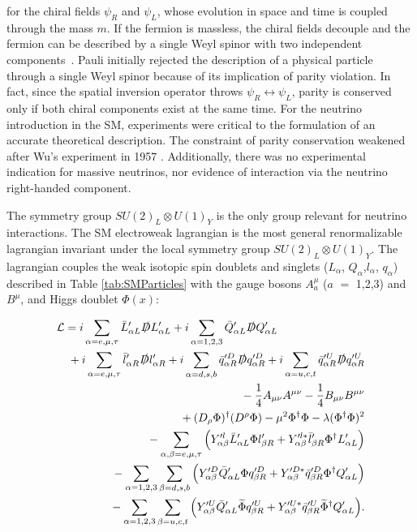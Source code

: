 for the chiral fields $\psi_R$ and $\psi_L$, whose evolution in space and time is coupled through the mass $m$.
If the fermion is massless, the chiral fields decouple and the fermion can be described by a single Weyl spinor with two independent components~\cite{Weyl:10.2307}. Pauli initially rejected the description of a physical particle through a single Weyl spinor because of its implication of parity violation. In fact, since the spatial inversion operator throws $\psi_R \leftrightarrow \psi_L$, parity is conserved only if both chiral components exist at the same time.  For the neutrino introduction in the SM, experiments were critical to the formulation of an accurate theoretical description.  The constraint of parity conservation weakened after Wu's experiment in 1957 \cite{PhysRev.105.1413}. Additionally,  there was no experimental indication for massive neutrinos, nor evidence of interaction via the neutrino right-handed component.%

The symmetry group $SU(2)_L \otimes U(1)_Y$ is the only group relevant for neutrino interactions. The SM electroweak lagrangian is the most general renormalizable lagrangian invariant under the local symmetry group $SU(2)_L \otimes U(1)_Y$. The lagrangian couples the weak isotopic spin doublets and singlets ($L_{\alpha}$, $Q_{\alpha}$,$l_{\alpha}$, $q_{\alpha}$) described in Table \ref{tab:SMParticles}  with the gauge bosons  $A^{\mu}_{a}$ ($a$ $=$ 1,2,3) and $B^{\mu}$, and Higgs doublet $\Phi(x)$:

\begin{eqnarray}
\lefteqn{\mathcal{L} = i\sum_{\alpha=e,\mu,\tau} \bar{L}'_{\alpha L}  \slashed D L'_{\alpha L} + 
 i\sum_{\alpha=1,2,3} \bar{Q}'_{\alpha L}  \slashed D Q'_{\alpha L} {}}
 \nonumber\\
 & & {} + i\sum_{\alpha=e,\mu,\tau} \bar{l}'_{\alpha R}  \slashed D l'_{\alpha R} + i\sum_{\alpha=d,s,b} \bar{q}'^D_{\alpha R}  \slashed D q'^D_{\alpha R} + i\sum_{\alpha=u,c,t} \bar{q}'^U_{\alpha R}  \slashed D q'^U_{\alpha R}
 \nonumber\\
 & & {} -\frac{1}{4}A_{\mu \nu}A^{\mu \nu} - \frac{1}{4}B_{\mu \nu}B^{\mu \nu}
 \nonumber\\
 & & {} +(D_{\rho}\Phi)^\dagger(D^{\rho}\Phi) - \mu^2\Phi^\dagger\Phi - \lambda(\Phi^\dagger\Phi)^2 
 \nonumber\\
 & & {} -\sum_{\alpha,\beta=e,\mu,\tau} \Big(Y'^l_{\alpha\beta}\bar{L}'_{\alpha L}  \Phi l'_{\beta R} + Y'^{l*}_{\alpha\beta}\bar{l}'_{\beta R}  \Phi^\dagger L'_{\alpha L}\Big)
  \nonumber\\
 & & {} -\sum_{\alpha=1,2,3} \sum_{\beta=d,s,b} \Big(Y'^D_{\alpha\beta}\bar{Q}'_{\alpha L}  \Phi q'^D_{\beta R} + Y'^{D*}_{\alpha\beta}\bar{q}'^D_{\beta R}  \Phi^\dagger Q'_{\alpha L}\Big)
  \nonumber\\
 & & {} -\sum_{\alpha=1,2,3} \sum_{\beta=u,c,t} \Big(Y'^U_{\alpha\beta}\bar{Q}'_{\alpha L}   \widetilde{\Phi} q'^U_{\beta R} + Y'^{U*}_{\alpha\beta}\bar{q}'^U_{\beta R} \widetilde{\Phi}^\dagger Q'_{\alpha L}\Big).
\end{eqnarray}

